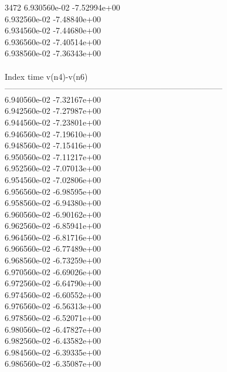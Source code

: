 3472	6.930560e-02	-7.52994e+00	\\ 	6.932560e-02	-7.48840e+00	\\ 	6.934560e-02	-7.44680e+00	\\ 	6.936560e-02	-7.40514e+00	\\ 	6.938560e-02	-7.36343e+00	\\ \hline
\\ \hline
Index   time            v(n4)-v(n6)     \\ \hline
--------------------------------------------------------------------------------\\ 	6.940560e-02	-7.32167e+00	\\ 	6.942560e-02	-7.27987e+00	\\ 	6.944560e-02	-7.23801e+00	\\ 	6.946560e-02	-7.19610e+00	\\ 	6.948560e-02	-7.15416e+00	\\ 	6.950560e-02	-7.11217e+00	\\ 	6.952560e-02	-7.07013e+00	\\ 	6.954560e-02	-7.02806e+00	\\ 	6.956560e-02	-6.98595e+00	\\ 	6.958560e-02	-6.94380e+00	\\ 	6.960560e-02	-6.90162e+00	\\ 	6.962560e-02	-6.85941e+00	\\ 	6.964560e-02	-6.81716e+00	\\ 	6.966560e-02	-6.77489e+00	\\ 	6.968560e-02	-6.73259e+00	\\ 	6.970560e-02	-6.69026e+00	\\ 	6.972560e-02	-6.64790e+00	\\ 	6.974560e-02	-6.60552e+00	\\ 	6.976560e-02	-6.56313e+00	\\ 	6.978560e-02	-6.52071e+00	\\ 	6.980560e-02	-6.47827e+00	\\ 	6.982560e-02	-6.43582e+00	\\ 	6.984560e-02	-6.39335e+00	\\ 	6.986560e-02	-6.35087e+00	\\ \hline
